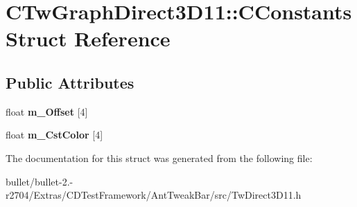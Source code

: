 \hypertarget{struct_c_tw_graph_direct3_d11_1_1_c_constants}{\section{C\+Tw\+Graph\+Direct3\+D11\+:\+:C\+Constants Struct Reference}
\label{struct_c_tw_graph_direct3_d11_1_1_c_constants}
}
\subsection*{Public Attributes}
\begin{DoxyCompactItemize}
\item 
\hypertarget{struct_c_tw_graph_direct3_d11_1_1_c_constants_a8c7bc1ff72cd09cb5ba02e724b487a23}{float {\bfseries m\+\_\+\+Offset} \mbox{[}4\mbox{]}}\label{struct_c_tw_graph_direct3_d11_1_1_c_constants_a8c7bc1ff72cd09cb5ba02e724b487a23}

\item 
\hypertarget{struct_c_tw_graph_direct3_d11_1_1_c_constants_aa13d76c9f0c73b795dc8564aae5a09e9}{float {\bfseries m\+\_\+\+Cst\+Color} \mbox{[}4\mbox{]}}\label{struct_c_tw_graph_direct3_d11_1_1_c_constants_aa13d76c9f0c73b795dc8564aae5a09e9}

\end{DoxyCompactItemize}


The documentation for this struct was generated from the following file\+:\begin{DoxyCompactItemize}
\item 
bullet/bullet-\/2.-\/r2704/\+Extras/\+C\+D\+Test\+Framework/\+Ant\+Tweak\+Bar/src/Tw\+Direct3\+D11.\+h\end{DoxyCompactItemize}
